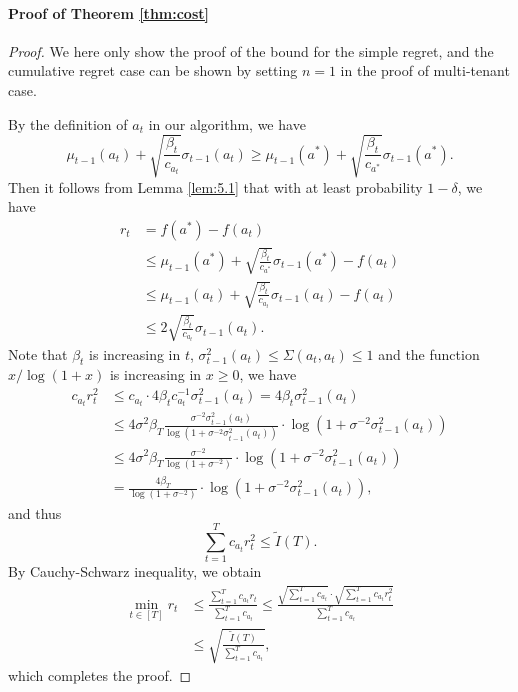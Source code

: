 \documentclass[letterpaper]{vldb}
\begin{document}
\paragraph*{Proof of Theorem \ref{thm:cost}}
\begin{proof}
We here only show the proof of the bound for the simple regret, and the cumulative regret case can be shown by setting $n=1$ in the proof of multi-tenant case.

By the definition of $a_t$ in our algorithm, we have
  \[
    \mu_{t-1}(a_t) + \sqrt{\frac{\beta_t}{c_{a_t}}}\sigma_{t-1}(a_t) \ge
    \mu_{t-1}(a^\ast) + \sqrt{\frac{\beta_t}{c_{a^\ast}}}\sigma_{t-1}(a^\ast).
  \]
  Then it follows from Lemma \ref{lem:5.1} that with at least probability
  $1-\delta$, we have
  \begin{align*}
    r_t & = f(a^\ast) - f(a_t)\\
        & \le \mu_{t-1}(a^\ast) + \sqrt{\frac{\beta_t}{c_{a^\ast}}}\sigma_{t-1}(a^\ast) - f(a_t)\\
        & \le \mu_{t-1}(a_t) + \sqrt{\frac{\beta_t}{c_{a_t}}}\sigma_{t-1}(a_t) - f(a_t)\\
    & \le 2 \sqrt{\frac{\beta_t}{c_{a_t}}}\sigma_{t-1}(a_t).
  \end{align*}
  Note that $\beta_t$ is increasing in $t$, $\sigma_{t-1}^2(a_t) \le \Sigma(a_t,a_t)\le 1$ and the function
  $x/\log(1+x)$ is increasing in $x\ge0$, we have
  \begin{align*}
    c_{a_t} r_t^2 &\le c_{a_t} \cdot 4\beta_t c^{-1}_{a_t} \sigma_{t-1}^2(a_t) = 4\beta_t \sigma_{t-1}^2(a_t)\\
                  & \le 4\sigma^2 \beta_T \frac{\sigma^{-2}\sigma^2_{t-1}(a_t)}{\log(1+\sigma^{-2}\sigma^2_{t-1}(a_t))}\cdot \log(1+\sigma^{-2}\sigma^2_{t-1}(a_t))\\
                  & \le 4\sigma^2 \beta_T \frac{\sigma^{-2}}{\log(1 + \sigma^{-2})}\cdot \log(1+\sigma^{-2}\sigma^2_{t-1}(a_t))\\
                  & = \frac{4\beta_T}{\log(1 + \sigma^{-2})}\cdot \log(1+\sigma^{-2}\sigma^2_{t-1}(a_t)),
  \end{align*}
  and thus
  \[
    \sum_{t=1}^Tc_{a_t} r_t^2 \le \tilde{I}(T).
  \]
  By Cauchy-Schwarz inequality, we obtain
  \begin{align*}
    \min_{t\in [T]}r_t & 
                         \le \frac{\sum_{t=1}^Tc_{a_t}r_t}{\sum_{t=1}^Tc_{a_t}}\le \frac{\sqrt{\sum_{t=1}^Tc_{a_t}}\cdot \sqrt{\sum_{t=1}^Tc_{a_t} r_t^2}}{\sum_{t=1}^Tc_{a_t}}\\
& \le \sqrt{\frac{\tilde{I}(T)}{\sum_{t=1}^T c_{a_t}}},
  \end{align*}
which completes the proof.
\end{proof}
\end{document}
